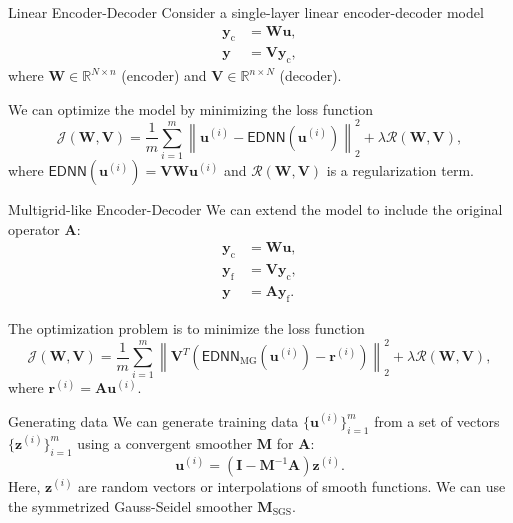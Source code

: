\documentclass{beamer}
\newcommand{\A}{\mathbf{A}}
\newcommand{\M}{\mathbf{M}}
\newcommand{\W}{\mathbf{W}}
\newcommand{\V}{\mathbf{V}}
\newcommand{\I}{\mathbf{I}}
\newcommand{\SGS}{\mathrm{SGS}}
\newcommand{\uu}{\mathbf{u}}
\newcommand{\yy}{\mathbf{y}}
\newcommand{\yyc}{\mathbf{y}_\mathrm{c}}
\newcommand{\yyf}{\mathbf{y}_\mathrm{f}}
\newcommand{\zz}{\mathbf{z}}
\newcommand{\EDNN}{\mathsf{EDNN}}
\newcommand{\EDNNMG}{\mathsf{EDNN}_\mathrm{MG}}
\newcommand{\J}{\mathcal{J}}
\newcommand{\R}{\mathcal{R}}
\begin{document}
\begin{frame}{Linear Encoder-Decoder}
    Consider a single-layer linear encoder-decoder model
    \begin{align*}
        \yyc &= \W \uu, \\
        \yy &= \V \yyc,
    \end{align*}
    where \(\W \in \mathbb{R}^{N \times n}\) (encoder) and \(\V \in \mathbb{R}^{n \times N}\) (decoder).

    \pause

    We can optimize the model by minimizing the loss function
    \begin{equation*}
        \J(\W, \V) = \frac{1}{m} \sum_{i=1}^{m} \left\| \uu^{(i)} - \EDNN(\uu^{(i)}) \right\|_2^2 + \lambda \R(\W, \V),
    \end{equation*}
    where \(\EDNN(\uu^{(i)}) = \V \W \uu^{(i)}\) and \(\R(\W, \V)\) is a regularization term.
\end{frame}

\begin{frame}{Multigrid-like Encoder-Decoder}
    We can extend the model to include the original operator \(\A\):
    \begin{align*}
        \yyc &= \W \uu, \\
        \yyf &= \V \yyc, \\
        \yy &= \A \yyf.
    \end{align*}

    \pause

    The optimization problem is to minimize the loss function
    \begin{equation*}
        \J(\W, \V) = \frac{1}{m} \sum_{i=1}^{m} \left\| \V^T( \EDNNMG(\uu^{(i)}) - \mathbf{r}^{(i)} ) \right\|_2^2 + \lambda \R(\W, \V),
    \end{equation*}
    where \(\mathbf{r}^{(i)} = \A \uu^{(i)}\).
\end{frame}

\begin{frame}{Generating data}
    We can generate training data \(\{ \uu^{(i)} \}_{i=1}^{m}\) from a set of vectors \(\{ \zz^{(i)} \}_{i=1}^{m}\) using a convergent smoother \(\M\) for \(\A\):
    \begin{equation*}
        \uu^{(i)} = (\I - \M^{-1} \A) \zz^{(i)}.
    \end{equation*}
    Here, \(\zz^{(i)}\) are random vectors or interpolations of smooth functions.
    We can use the symmetrized Gauss-Seidel smoother \(\M_\SGS\).
\end{frame}
\end{document}
